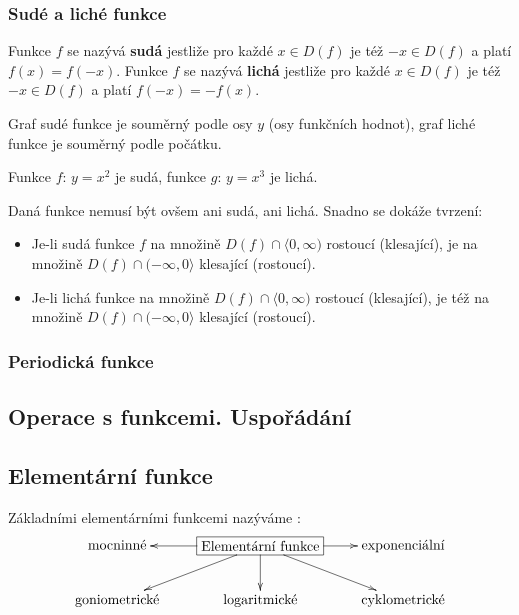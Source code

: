       \subsubsection{Sudé a liché funkce}
        \begin{definition}\label{MA1:def_lim04}
          Funkce $f$ se nazývá \textbf{sudá} jestliže pro každé $x\in D(f)$ je též $-x\in D(f)$
          a platí $f(x)=f(-x)$.
          Funkce $f$ se nazývá \textbf{lichá} jestliže pro každé $x\in D(f)$ je též $-x\in D(f)$
          a platí $f(-x)=-f(x)$. 
        \end{definition}
        Graf sudé funkce je souměrný podle osy $y$ (osy funkčních hodnot), graf liché funkce je 
        souměrný podle počátku. 
        \begin{example}\label{MAI:exam08}
          Funkce $f:\,y=x^2$ je sudá, funkce $g:\,y=x^3$ je lichá.
              
        \end{example}
        Daná funkce nemusí být ovšem ani sudá, ani lichá. Snadno se dokáže tvrzení:
        \begin{itemize}
          \item Je-li sudá funkce $f$ na množině $D(f)\cap\langle0,\infty)$ rostoucí (klesající),
                je na množině $D(f)\cap(-\infty,0\rangle$ klesající (rostoucí).
          \item Je-li lichá funkce na množině $D(f)\cap\langle0,\infty)$ rostoucí (klesající),
                je též na množině $D(f)\cap(-\infty,0\rangle$ klesající (rostoucí).                 
        \end{itemize}
      \subsubsection{Periodická funkce}
    \subsection{Operace s funkcemi. Uspořádání}       
    
    \subsection{Elementární funkce}
      Základními elementárními funkcemi nazýváme \cite[s.~10]{PolakMA1}:
      \begin{displaymath}
        \xymatrix{
        \mbox{mocninné} & *+[F]{\mbox{Elementární funkce}}\ar@{->}[l]\ar@{->}[dl]\ar@{->}[d]\ar@{->}[dr]\ar@{->}[r]& \mbox{exponenciální}   \\
        \mbox{goniometrické}       &   \mbox{logaritmické}      & \mbox{cyklometrické}
        }
      \end{displaymath}
  
